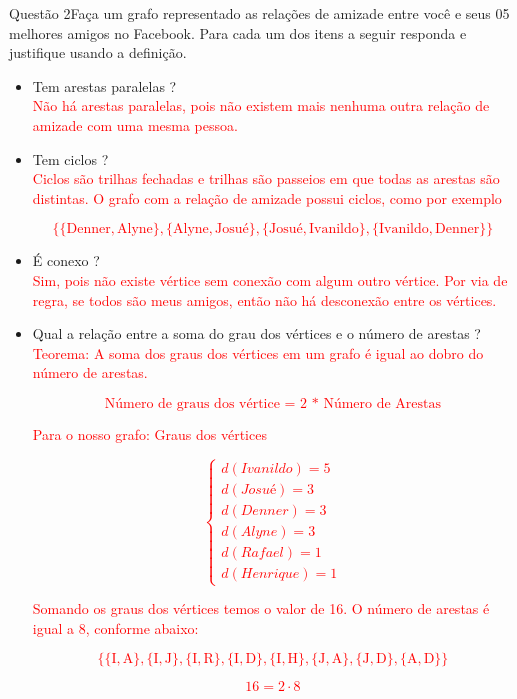 \documentclass[12pt]{article}
\begin{document}
\begin{section}{Questão 2}{Faça um grafo representado as relações de amizade entre você e seus 05 melhores amigos no Facebook. Para cada um dos itens a seguir responda e justifique usando a definição.}
\begin{itemize}
    \item[(d)] Tem arestas paralelas ?\\
\noindent \textcolor{red}{Não há arestas paralelas, pois não existem mais nenhuma outra relação de amizade com uma mesma pessoa.}
    
    \item[(e)] Tem ciclos ?\\
\noindent \textcolor{red}{Ciclos são trilhas fechadas e trilhas são passeios em que todas as arestas são distintas. O grafo com a relação de amizade possui ciclos, como por exemplo}

\textcolor{red}{$$\{\{\text{Denner},\text{Alyne}\},\{\text{Alyne},\text{Josué}\},\{\text{Josué},\text{Ivanildo}\},\{\text{Ivanildo},\text{Denner}\}\}$$}
    
    \item[(f)] É conexo ?\\
\textcolor{red}{Sim, pois não existe vértice sem conexão com algum outro vértice. Por via de regra, se todos são meus amigos, então não há desconexão entre os vértices.}
    
    \item[(g)] Qual a relação entre a soma do grau dos vértices e o número de arestas ?\\
\textcolor{red}{Teorema: A soma dos graus dos
vértices em um grafo é igual ao
dobro do número de arestas.}

\textcolor{red}{$$ \text{Número de graus dos vértice = 2 * Número de Arestas} $$}
    
\textcolor{red}{Para o nosso grafo: Graus dos vértices}

\textcolor{red}{$$\left \{ \begin{matrix}  d(Ivanildo) = 5\\ d(Josué) = 3 \\d(Denner) = 3 \\d(Alyne) = 3 \\d(Rafael) = 1\\ d(Henrique) = 1 \end{matrix} \right.$$}

\textcolor{red}{Somando os graus dos vértices temos o valor de 16. O número de arestas é igual a 8, conforme abaixo:}

\textcolor{red}{$$\{\{\text{I},\text{A}\},\{\text{I},\text{J}\},\{\text{I},\text{R}\},\{\text{I},\text{D}\},\{\text{I},\text{H}\},\{\text{J},\text{A}\}, \{\text{J},\text{D}\},\{\text{A},\text{D}\}\}$$}

\textcolor{red}{$$ \boxed{16 = 2 \cdot 8 }$$}

\end{itemize}

\end{section}
\end{document}
